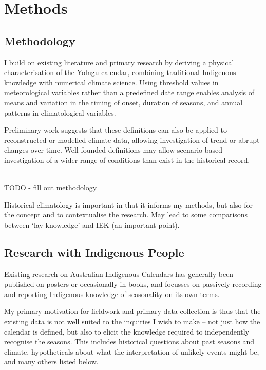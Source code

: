 \chapter{Methods}
\label{ch:methods}

\section{Methodology}

I build on existing literature and primary research by deriving a physical
characterisation of the Yolngu calendar, combining traditional Indigenous
knowledge with numerical climate science. Using threshold values in meteorological
variables rather than a predefined date range enables analysis of means and
variation in the timing of onset, duration of seasons, and annual patterns
in climatological variables.

Preliminary work suggests that these definitions can also be applied to
reconstructed or modelled climate data, allowing investigation of trend
or abrupt changes over time. Well-founded definitions may allow scenario-based
investigation of a wider range of conditions than exist in the historical record. 

~\\

TODO - fill out methodology

Historical climatology is important in that it informs my methods,
but also for the concept and to contextualise the research.  May lead to 
some comparisons between `lay knowledge' and IEK (an important point).\\





\section{Research with Indigenous People}



Existing research on Australian Indigenous Calendars has generally been 
published on posters or occasionally in books, and focusses on passively 
recording and reporting Indigenous knowledge of seasonality on its own terms.  

My primary motivation for fieldwork and primary data collection is thus that 
the existing data is not well suited to the inquiries I wish to make – not just 
how the calendar is defined, but also to elicit the knowledge required to 
independently recognise the seasons.  This includes historical questions about 
past seasons and climate, hypotheticals about what the interpretation of 
unlikely events might be, and many others listed below.

